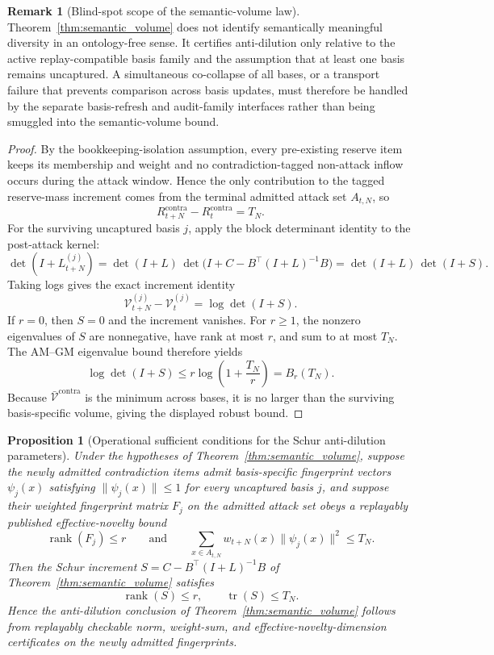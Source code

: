 \documentclass[11pt]{article}
\newtheorem{proposition}[theorem]{Proposition}
\theoremstyle{definition}
\newtheorem{remark}[theorem]{Remark}
\newcommand{\1}{\mathbf{1}}
\begin{document}
\begin{remark}[Blind-spot scope of the semantic-volume law]
Theorem~\ref{thm:semantic_volume} does not identify semantically meaningful diversity in an ontology-free sense. It certifies anti-dilution only relative to the active replay-compatible basis family and the assumption that at least one basis remains uncaptured. A simultaneous co-collapse of all bases, or a transport failure that prevents comparison across basis updates, must therefore be handled by the separate basis-refresh and audit-family interfaces rather than being smuggled into the semantic-volume bound.
\end{remark}

\begin{proof}
By the bookkeeping-isolation assumption, every pre-existing reserve item keeps its membership and weight and no contradiction-tagged non-attack inflow occurs during the attack window. Hence the only contribution to the tagged reserve-mass increment comes from the terminal admitted attack set $A_{t,N}$, so
\[
R_{t+N}^{\mathrm{contra}}-R_t^{\mathrm{contra}}=T_N.
\]
For the surviving uncaptured basis $j$, apply the block determinant identity to the post-attack kernel:
\[
\det(I+L_{t+N}^{(j)})=
\det(I+L)\,\det\!\bigl(I+C-B^\top(I+L)^{-1}B\bigr)=\det(I+L)\,\det(I+S).
\]
Taking logs gives the exact increment identity
\[
\mathcal V_{t+N}^{(j)}-\mathcal V_t^{(j)}=\log\det(I+S).
\]
If $r=0$, then $S=0$ and the increment vanishes. For $r\ge1$, the nonzero eigenvalues of $S$ are nonnegative, have rank at most $r$, and sum to at most $T_N$. The AM--GM eigenvalue bound therefore yields
\[
\log\det(I+S)\le r\log\!\left(1+\frac{T_N}{r}\right)=B_r(T_N).
\]
Because $\bar{\mathcal V}^{\mathrm{contra}}$ is the minimum across bases, it is no larger than the surviving basis-specific volume, giving the displayed robust bound.
\end{proof}

\begin{proposition}[Operational sufficient conditions for the Schur anti-dilution parameters]\label{prop:semantic_volume_operational}
Under the hypotheses of Theorem~\ref{thm:semantic_volume}, suppose the newly admitted contradiction items admit basis-specific fingerprint vectors $\psi_j(x)$ satisfying $\|\psi_j(x)\|\le 1$ for every uncaptured basis $j$, and suppose their weighted fingerprint matrix $F_j$ on the admitted attack set obeys a replayably published effective-novelty bound
\[
\operatorname{rank}(F_j)\le r
\qquad\text{and}\qquad
\sum_{x\in A_{t,N}} w_{t+N}(x)\|\psi_j(x)\|^2\le T_N.
\]
Then the Schur increment $S=C-B^\top(I+L)^{-1}B$ of Theorem~\ref{thm:semantic_volume} satisfies
\[
\operatorname{rank}(S)\le r,
\qquad
\operatorname{tr}(S)\le T_N.
\]
Hence the anti-dilution conclusion of Theorem~\ref{thm:semantic_volume} follows from replayably checkable norm, weight-sum, and effective-novelty-dimension certificates on the newly admitted fingerprints.
\end{proposition}
\end{document}
